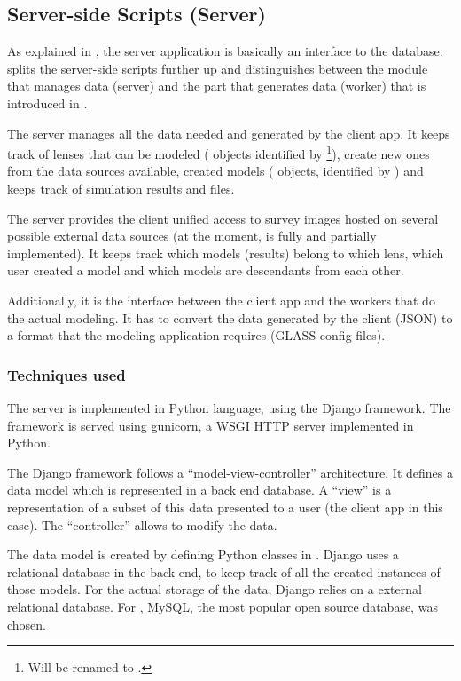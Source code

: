 \subsection{Server-side Scripts (Server)}
\label{sec:server}

As explained in , the server application is basically an interface to the database.
\spl splits the server-side scripts further up and distinguishes between the module that manages data (server) and the part that generates data (worker) that is introduced in .

The server manages all the data needed and generated by the client app.
It keeps track of lenses that can be modeled ( objects identified by \footnote{Will be renamed to .}), create new ones from the data sources available, created models ( objects, identified by ) and keeps track of simulation results and files.

The server provides the client unified access to survey images hosted on several possible external data sources (at the moment, \sw is fully and \ml partially implemented).
It keeps track which models (results) belong to which lens, which user created a model and which models are descendants from each other.

Additionally, it is the interface between the client app and the workers that do the actual modeling.
It has to convert the data generated by the client (JSON) to a format that the modeling application requires (GLASS config files).


\subsubsection{Techniques used}

The server is implemented in Python language, using the Django framework.
The framework is served using gunicorn, a WSGI HTTP server implemented in Python.

The Django framework follows a ``model-view-controller'' architecture.
It defines a data model which is represented in a back end database.
A ``view'' is a representation of a subset of this data presented to a user (the client app in this case).
The ``controller'' allows to modify the data.

The data model is created by defining Python classes in .
Django uses a relational database in the back end, to keep track of all the created instances of those models.
For the actual storage of the data, Django relies on a external relational database.
For \spl, MySQL, the most popular\cite{dbranking} open source database, was chosen.

